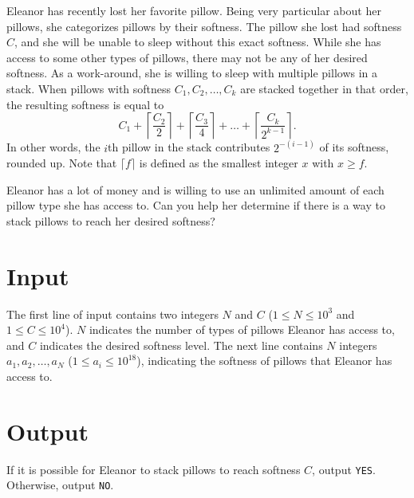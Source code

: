 
Eleanor has recently lost her favorite pillow.
Being very particular about her pillows, she categorizes pillows by their softness.
The pillow she lost had softness $C$, and she will be unable to sleep without this exact softness.
While she has access to some other types of pillows, there may not be any of her desired softness.
As a work-around, she is willing to sleep with multiple pillows in a stack.
When pillows with softness $C_1, C_2, \ldots, C_k$ are stacked together in that order, the resulting softness is equal to 
\[
    C_1 + \left\lceil \frac{C_2}{2} \right\rceil + \left\lceil \frac{C_3}{4} \right\rceil + \ldots + \left\lceil \frac{C_k}{2^{k-1}} \right\rceil.
\]
In other words, the $i$th pillow in the stack contributes $2^{-(i-1)}$ of its softness, rounded up.
Note that $\lceil f \rceil$ is defined as the smallest integer $x$ with $x \geq f$.

Eleanor has a lot of money and is willing to use an unlimited amount of each pillow type she has access to.
Can you help her determine if there is a way to stack pillows to reach her desired softness?

\section*{Input}
The first line of input contains two integers $N$ and $C$ ($1 \leq N \leq 10^3$ and $1 \leq C \leq 10^4$).
$N$ indicates the number of types of pillows Eleanor has access to, and $C$ indicates the desired softness level.
The next line contains $N$ integers $a_1, a_2, \ldots, a_N$ ($1 \leq a_i \leq 10^{18}$), indicating the softness of pillows that Eleanor has access to.

\section*{Output}
If it is possible for Eleanor to stack pillows to reach softness $C$, output \texttt{YES}. 
Otherwise, output \texttt{NO}.
